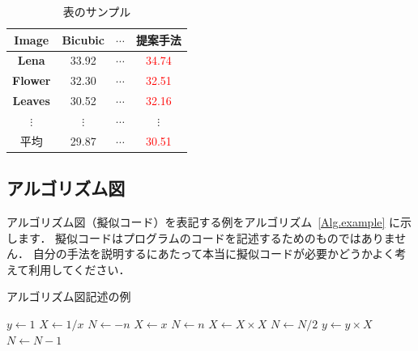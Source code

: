 \documentclass[dvipdfmx,disablejfam,nosetpagesize,12pt]{jsbook}
\begin{document}
\begin{table}[t]
   \centering
   \caption{表のサンプル}\label{Tbl.example}
   \small
   \begin{tabular}{c|ccc}
      \hline
      \textbf{Image}  & Bicubic  & $\cdots$ & 提案手法 \\
      \hline
      \textbf{Lena}   & 33.92    & $\cdots$ & \textcolor{red}{34.74} \\
      \textbf{Flower} & 32.30    & $\cdots$ & \textcolor{red}{32.51} \\
      \textbf{Leaves} & 30.52    & $\cdots$ & \textcolor{red}{32.16} \\
      $\vdots$        & $\vdots$ & $\cdots$ &    $\vdots$        \\\hline
      平均            & 29.87    & $\cdots$ & \textcolor{red}{30.51} \\\hline
   \end{tabular}
\end{table}

\subsection{アルゴリズム図}
アルゴリズム図（擬似コード）を表記する例をアルゴリズム~\ref{Alg.example} に示します．
擬似コードはプログラムのコードを記述するためのものではありません．
自分の手法を説明するにあたって本当に擬似コードが必要かどうかよく考えて利用してください．

\begin{algorithm}[t]
   \caption{アルゴリズム図記述の例}
   \label{Alg.example}
   \begin{algorithmic}[1]
      \STATE $y \leftarrow 1$
         \STATE $X \leftarrow 1 / x$
         \STATE $N \leftarrow -n$
      \ELSE
         \STATE $X \leftarrow x$
         \STATE $N \leftarrow n$
      \ENDIF
            \STATE $X \leftarrow X \times X$
            \STATE $N \leftarrow N / 2$
         \ELSE[$N$ is odd]
            \STATE $y \leftarrow y \times X$
            \STATE $N \leftarrow N - 1$
         \ENDIF
      \ENDWHILE
   \end{algorithmic}
\end{algorithm}
\end{document}

